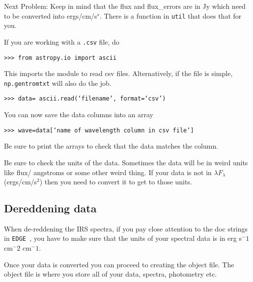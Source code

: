 \documentclass{article}
\newcommand{\edge}{\texttt{EDGE }}
\begin{document}



Next Problem:   Keep in mind that the flux and flux\_errors are in Jy which need to be converted into ergs/cm/s$^s$. There is a function in \texttt{util} that does that for you.

If you are working with a \texttt{.csv} file, do

\vspace{2mm}
\texttt{>>> from astropy.io import ascii}  
\vspace{2mm}

This imports the module to read csv files. Alternatively, if the file is simple, \texttt{np.gentromtxt} will also do the job.

\vspace{2mm}
\texttt{>>> data= ascii.read(`filename', format=`csv')}
\vspace{2mm}

You can now save the data columns into an array

\vspace{2mm}
\texttt{>>> wave=data[`name of wavelength column in csv file']}
\vspace{2mm}

Be sure to print the arrays to check that the data matches the column.

Be sure to check the units of the data.  Sometimes the data will be in weird units like  flux/ angstroms or some other weird thing. If your data is not in $\lambda F_\lambda$ (ergs/cm/s$^2$) then you need to convert it to get to those units. 

\subsection{Dereddening data}

When de-reddening the IRS spectra, if you pay close attention to the doc strings in \edge, you have to make sure that the units of your spectral data is in erg s$^-1$ cm$^-2$ cm$^-1$. 

Once your data is converted you can proceed to creating the object file. The object file is where you store all of your data, spectra, photometry etc. 
\end{document}
